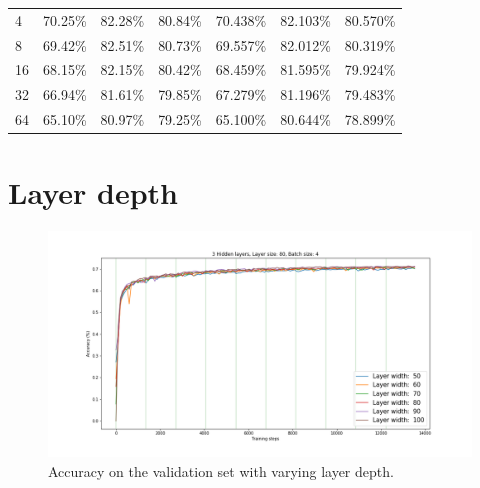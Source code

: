 \begin{table}[h]
\begin{tabular}{lllllll}
4          & 70.25\%     & 82.28\%                                                                       & \multicolumn{1}{l|}{80.84\%}                                                                       & 70.438\%    & 82.103\%                                                                   & 80.570\%                                                                \\
8          & 69.42\%     & 82.51\%                                                                       & \multicolumn{1}{l|}{80.73\%}                                                                       & 69.557\%    & 82.012\%                                                                   & 80.319\%                                                                \\
16         & 68.15\%     & 82.15\%                                                                       & \multicolumn{1}{l|}{80.42\%}                                                                       & 68.459\%    & 81.595\%                                                                   & 79.924\%                                                                \\
32         & 66.94\%     & 81.61\%                                                                       & \multicolumn{1}{l|}{79.85\%}                                                                       & 67.279\%    & 81.196\%                                                                   & 79.483\%                                                                \\
64         & 65.10\%     & 80.97\%                                                                       & \multicolumn{1}{l|}{79.25\%}                                                                       & 65.100\%    & 80.644\%                                                                   & 78.899\%                                                               
\end{tabular}
\end{table}

\section*{Layer depth}

\begin{figure}[h]
  \centering
  \includegraphics[width=\linewidth]{../graphs/new/layer_width_2}
  \caption{Accuracy on the validation set with varying layer depth.}
\end{figure}
